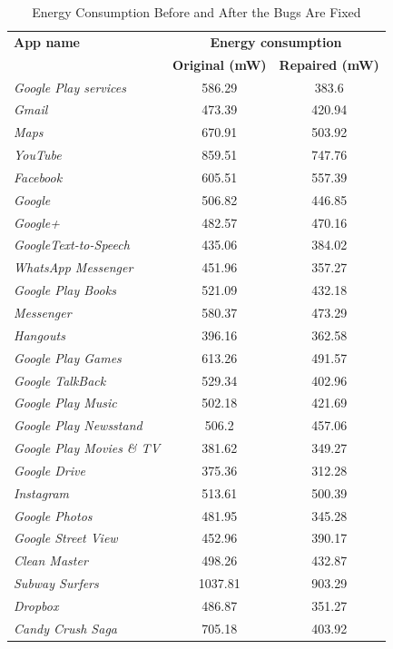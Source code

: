 \documentclass[conference]{IEEEtran}
\begin{document}
\begin{table}
\centering
\footnotesize
\caption{Energy Consumption Before and After the Bugs Are Fixed}
\begin{tabular}{|l|cc|}\hline
{\bf App name}&\multicolumn{2}{|c|}{\textbf{Energy consumption}}\\
& {\bf Original (mW)}&{\bf Repaired (mW)}\\
\hline
\hline
{\it Google Play services}&586.29&383.6\\
{\it Gmail}&473.39&420.94\\
{\it Maps}&670.91&503.92\\
{\it YouTube}&859.51&747.76\\
{\it Facebook}&605.51&557.39\\
{\it Google}&506.82&446.85\\
{\it Google+}&482.57&470.16\\
{\it GoogleText-to-Speech}&435.06&384.02\\
{\it WhatsApp Messenger}&451.96&357.27\\
{\it Google Play Books}&521.09&432.18\\
{\it Messenger}&580.37&473.29\\
{\it Hangouts}&396.16&362.58\\
{\it Google Play Games}&613.26&491.57\\
{\it Google TalkBack}&529.34&402.96\\
{\it Google Play Music}&502.18&421.69\\
{\it Google Play Newsstand}&506.2&457.06\\
{\it Google Play Movies \& TV}&381.62&349.27\\
{\it Google Drive}&375.36&312.28\\
{\it Instagram}&513.61&500.39\\
{\it Google Photos}&481.95&345.28\\
{\it Google Street View}&452.96&390.17\\
{\it Clean Master}&498.26&432.87\\
{\it Subway Surfers}&1037.81&903.29\\
{\it Dropbox}&486.87&351.27\\
{\it Candy Crush Saga}&705.18&403.92\\

\end{tabular}
\end{table}
\end{document}
